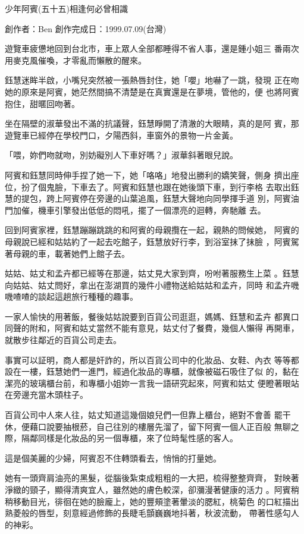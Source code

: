 



少年阿賓(五十五)相逢何必曾相識

創作者：Ben
創作完成日：1999.07.09(台灣)

遊覽車疲憊地回到台北市，車上眾人全部都睡得不省人事，還是鍾小姐三
番兩次用麥克風催喚，才零亂而懶散的醒來。

鈺慧迷眸半啟，小嘴兒突然被一張熱唇封住，她「嚶」地嚇了一跳，發現
正在吻她的原來是阿賓，她茫然間搞不清楚是在真實還是在夢境，管他的，便
也將阿賓抱住，甜暱回吻著。

坐在隔壁的淑華發出不滿的抗議聲，鈺慧睜開了清澈的大眼睛，真的是阿
賓，那遊覽車已經停在學校門口，夕陽西斜，車窗外的景物一片金黃。

「喂，妳們吻就吻，別妨礙別人下車好嗎？」淑華斜著眼兒說。

阿賓和鈺慧同時伸手捏了她一下，她「咯咯」地發出勝利的嬌笑聲，側身
擠出座位，扮了個鬼臉，下車去了。阿賓和鈺慧也跟在她後頭下車，到行李格
去取出鈺慧的提包，跨上阿賓停在旁邊的山葉追風，鈺慧大聲地向同學揮手道
別，阿賓油門加催，機車引擎發出低低的悶吼，擺了一個漂亮的迴轉，奔馳離
去。

回到阿賓家裡，鈺慧蹦蹦跳跳的和阿賓的母親攬在一起，親熱的問候她，
阿賓的母親說已經和姑姑約了一起去吃館子，鈺慧放好行李，到浴室抹了抹臉
，阿賓駕著母親的車，載著她們上館子去。

姑姑、姑丈和孟卉都已經等在那邊，姑丈見大家到齊，吩咐著服務生上菜
。鈺慧向姑姑、姑丈問好，拿出在澎湖買的幾件小禮物送給姑姑和孟卉，同時
和孟卉嘰嘰喳喳的談起這趟旅行種種的趣事。

一家人愉快的用著飯，餐後姑姑說要到百貨公司逛逛，媽媽、鈺慧和孟卉
都異口同聲的附和，阿賓和姑丈當然不能有意見，姑丈付了餐費，幾個人懶得
再開車，就散步往鄰近的百貨公司走去。

事實可以証明，商人都是奸詐的，所以百貨公司中的化妝品、女鞋、內衣
等等都設在一樓，鈺慧她們一進門，經過化妝品的專櫃，就像被磁石吸住了似
的，黏在潔亮的玻璃櫃台前，和專櫃小姐妳一言我一語研究起來，阿賓和姑丈
便瞪著眼站在旁邊充當木頭柱子。

百貨公司中人來人往，姑丈知道這幾個娘兒們一但靠上櫃台，絕對不會善
罷干休，便藉口說要抽根菸，自己往別的樓層先溜了，留下阿賓一個人正百般
無聊之際，隔鄰同樣是化妝品的另一個專櫃，來了位時髦性感的客人。

這是個美麗的少婦，阿賓忍不住轉頭看去，悄悄的打量她。

她有一頭齊肩油亮的黑髮，從腦後紮束成粗粗的一大把，梳得整整齊齊，
對映著淨緻的頸子，顯得清爽宜人，雖然她的膚色較深，卻瀰漫著健康的活力
。阿賓稍稍移動目光，徘徊在她的臉龐上，她的豐頰塗著暈淡的腮紅，桃菊色
的口紅描出熟菱般的唇型，刻意經過修飾的長睫毛顫巍巍地抖著，秋波流動，
帶著性感勾人的神彩。


